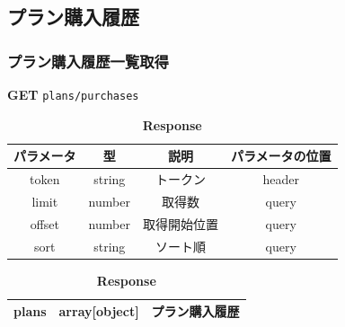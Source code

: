 \subsection{プラン購入履歴}
\subsubsection*{プラン購入履歴一覧取得}
\textbf{GET} \texttt{plans/purchases}
\begin{table}[H]
  \begin{minipage}
    {0.5\hsize}
    \centering
    \captionsetup{labelformat=empty,labelsep=none} \caption{\textbf{Request}}
    \small
    \begin{tabular}{|c|c|c|c|} \hline
      パラメータ  & 型      & 説明     & パラメータの位置 \\ \hline \hline
      token  & string & トークン   & header   \\ \hline
      limit  & number & 取得数    & query    \\ \hline
      offset & number & 取得開始位置 & query    \\ \hline
      sort   & string & ソート順   & query    \\ \hline
    \end{tabular}
  \end{minipage}
  \begin{minipage}
    {0.5\hsize} \centering \captionsetup{labelformat=empty,labelsep=none} \caption{\textbf{Response}}
    \begin{tabular}{|c|c|c|} \hline
      plans & array[object] & プラン購入履歴 \\ \hline
    \end{tabular}
  \end{minipage}
\end{table}